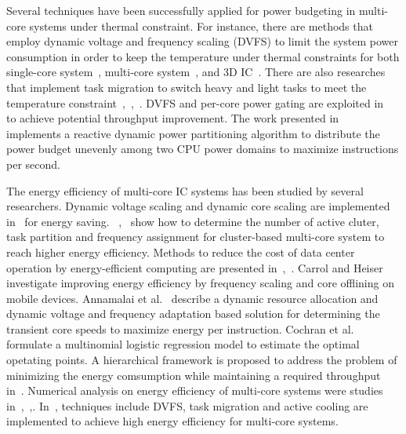 Several techniques have been successfully applied for power budgeting in multi-core systems under thermal constraint. For instance, there are methods that employ dynamic voltage and frequency scaling (DVFS) to limit the system power consumption in order to keep the temperature under thermal constraints for both single-core system~\cite{Skadron:MICRO'03}, multi-core system~\cite{Jayaseelan:ICCAD'09}, and 3D IC~\cite{Coskun:DATE'09}. There are also researches that implement task migration to switch heavy and light tasks to meet the temperature constraint~\cite{Ge:DAC'10},~\cite{Chantem:TVLSI'11},~\cite{Liu:DATE'12}. DVFS and per-core power gating are exploited in~\cite{Lee:TVLSI'12} to achieve potential throughput improvement. The work presented in~\cite{Kultursay:CHSCSS'12} implements a reactive dynamic power partitioning 
algorithm to distribute the power budget unevenly among two CPU power domains to maximize instructions per second. %

The energy efficiency of multi-core IC systems has been studied by several researchers. Dynamic voltage scaling and dynamic core scaling are implemented in~\cite{Seo:TPDS'08} for energy saving. ~\cite{Majzoub:TCAD'10},~\cite{Kong:DATE'11} show how to determine the number of active cluter, task partition and frequency assignment for cluster-based multi-core system to reach higher energy efficiency. Methods to reduce the cost of data center operation by energy-efficient computing are presented in~\cite{Pedram:TCAD'12},~\cite{Wang:access'17}. Carrol and Heiser~\cite{Carroll:RTAS'14} investigate improving energy efficiency by frequency scaling and core offlining on mobile devices. Annamalai et al.~\cite{Annamalai:ISVLSI'14} describe a dynamic resource allocation and dynamic voltage and frequency adaptation based solution for determining the transient core speeds to maximize energy per instruction. Cochran et al.~\cite{Cochran:ICCAD'11} formulate a multinomial logistic regression model to estimate the optimal opetating points. A hierarchical framework is proposed to address the problem of minimizing the energy comsumption while maintaining a required throughput in~\cite{Ghasemazar:ISCAS'10}. Numerical analysis on energy efficiency of multi-core systems were studies in~\cite{Woo:Computer'08},~\cite{Hill:Computer'08},\cite{Sun:JPDC'10}. In~\cite{Hanumaiah:TCOMP'14}, techniques include DVFS, task migration and active cooling are implemented to achieve high energy efficiency for multi-core systems.

